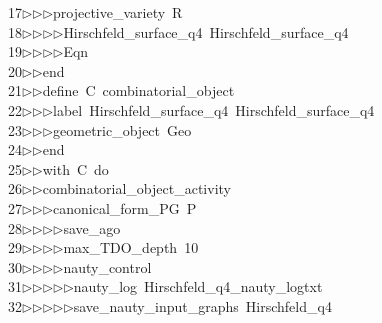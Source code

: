 \begin{tabbing}
17\>$\triangleright$\>$\triangleright$\>$\triangleright$\>projective\_variety\ R\ \\[0pt]
18\>$\triangleright$\>$\triangleright$\>$\triangleright$\>$\triangleright$\>Hirschfeld\_surface\_q4\ Hirschfeld\_surface\_q4\ \\[0pt]
19\>$\triangleright$\>$\triangleright$\>$\triangleright$\>$\triangleright$\>Eqn\ \\[0pt]
20\>$\triangleright$\>$\triangleright$\>end\ \\[0pt]
21\>$\triangleright$\>$\triangleright$\>define\ C\ combinatorial\_object\ \\[0pt]
22\>$\triangleright$\>$\triangleright$\>$\triangleright$\>label\ Hirschfeld\_surface\_q4\ Hirschfeld\_surface\_q4\ \\[0pt]
23\>$\triangleright$\>$\triangleright$\>$\triangleright$\>geometric\_object\ Geo\ \\[0pt]
24\>$\triangleright$\>$\triangleright$\>end\ \\[0pt]
25\>$\triangleright$\>$\triangleright$\>with\ C\ do\ \\[0pt]
26\>$\triangleright$\>$\triangleright$\>combinatorial\_object\_activity\ \\[0pt]
27\>$\triangleright$\>$\triangleright$\>$\triangleright$\>canonical\_form\_PG\ P\ \\[0pt]
28\>$\triangleright$\>$\triangleright$\>$\triangleright$\>$\triangleright$\>save\_ago\ \\[0pt]
29\>$\triangleright$\>$\triangleright$\>$\triangleright$\>$\triangleright$\>max\_TDO\_depth\ 10\ \\[0pt]
30\>$\triangleright$\>$\triangleright$\>$\triangleright$\>$\triangleright$\>nauty\_control\ \\[0pt]
31\>$\triangleright$\>$\triangleright$\>$\triangleright$\>$\triangleright$\>$\triangleright$\>nauty\_log\ Hirschfeld\_q4\_nauty\_logtxt\ \\[0pt]
32\>$\triangleright$\>$\triangleright$\>$\triangleright$\>$\triangleright$\>$\triangleright$\>save\_nauty\_input\_graphs\ Hirschfeld\_q4\ \\[0pt]

\end{tabbing}
